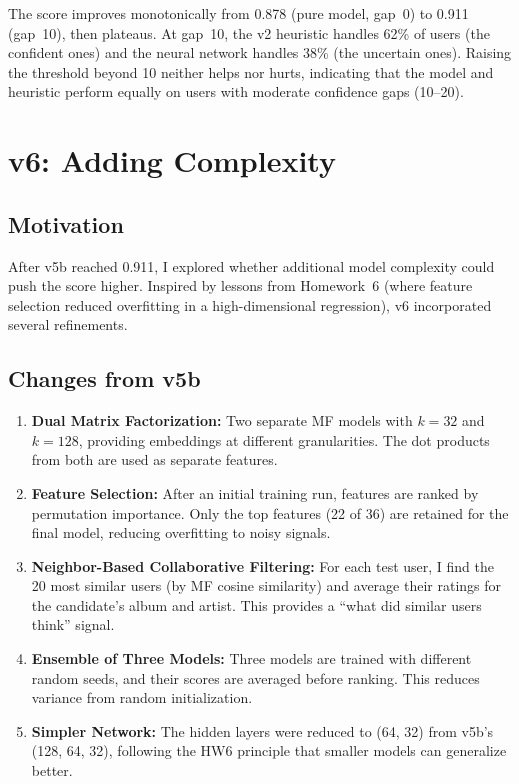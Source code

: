 \documentclass[12pt]{article}
\begin{document}
\newpage
The score improves monotonically from 0.878 (pure model, gap~0) to 0.911 (gap~10), then plateaus. At gap~10, the v2 heuristic handles 62\% of users (the confident ones) and the neural network handles 38\% (the uncertain ones). Raising the threshold beyond 10 neither helps nor hurts, indicating that the model and heuristic perform equally on users with moderate confidence gaps (10--20).

\newpage
\section{v6: Adding Complexity}

\subsection{Motivation}

After v5b reached 0.911, I explored whether additional model complexity could push the score higher. Inspired by lessons from Homework~6 (where feature selection reduced overfitting in a high-dimensional regression), v6 incorporated several refinements.

\subsection{Changes from v5b}

\begin{enumerate}
	\item \textbf{Dual Matrix Factorization:} Two separate MF models with $k = 32$ and $k = 128$, providing embeddings at different granularities. The dot products from both are used as separate features.

	\item \textbf{Feature Selection:} After an initial training run, features are ranked by permutation importance. Only the top features (22 of 36) are retained for the final model, reducing overfitting to noisy signals.

	\item \textbf{Neighbor-Based Collaborative Filtering:} For each test user, I find the 20 most similar users (by MF cosine similarity) and average their ratings for the candidate's album and artist. This provides a ``what did similar users think'' signal.

	\item \textbf{Ensemble of Three Models:} Three models are trained with different random seeds, and their scores are averaged before ranking. This reduces variance from random initialization.

	\item \textbf{Simpler Network:} The hidden layers were reduced to (64, 32) from v5b's (128, 64, 32), following the HW6 principle that smaller models can generalize better.
\end{enumerate}
\end{document}
